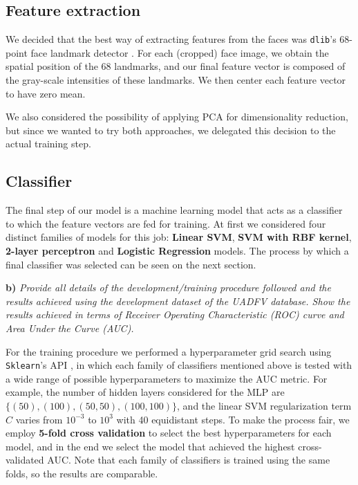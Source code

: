 \documentclass[11pt]{article}
\begin{document}
\subsection*{Feature extraction}

We decided that the best way of extracting features from the faces was \texttt{dlib}'s 68-point face landmark detector \citep{dlib09}. For each (cropped) face image, we obtain the spatial position of the 68 landmarks, and our final feature vector is composed of the gray-scale intensities of these landmarks. We then center each feature vector to have zero mean.

We also considered the possibility of applying PCA for dimensionality reduction, but since we wanted to try both approaches, we delegated this decision to the actual training step.

\subsection*{Classifier}

The final step of our model is a machine learning model that acts as a classifier to which the feature vectors are fed for training. At first we considered four distinct families of models for this job: \textbf{Linear SVM}, \textbf{SVM with RBF kernel}, \textbf{2-layer perceptron} and \textbf{Logistic Regression} models. The process by which a final classifier was selected can be seen on the next section.

\textbf{b)} \textit{Provide all details of the development/training procedure followed and the results achieved using the development dataset of the UADFV database. Show the results achieved in terms of Receiver Operating Characteristic (ROC) curve and Area Under the Curve (AUC).}

For the training procedure we performed a hyperparameter grid search using \texttt{Sklearn}'s API \citep{sklearn_api}, in which each family of classifiers mentioned above is tested with a wide range of possible hyperparameters to maximize the AUC metric. For example, the number of hidden layers considered for the MLP are \( \{(50), (100), (50, 50), (100, 100)\} \), and the linear SVM regularization term \( C \) varies from \( 10^{-3} \) to \( 10^{3} \) with 40 equidistant steps. To make the process fair, we employ \textbf{5-fold cross validation} to select the best hyperparameters for each model, and in the end we select the model that achieved the highest cross-validated AUC. Note that each family of classifiers is trained using the same folds, so the results are comparable.
\end{document}
